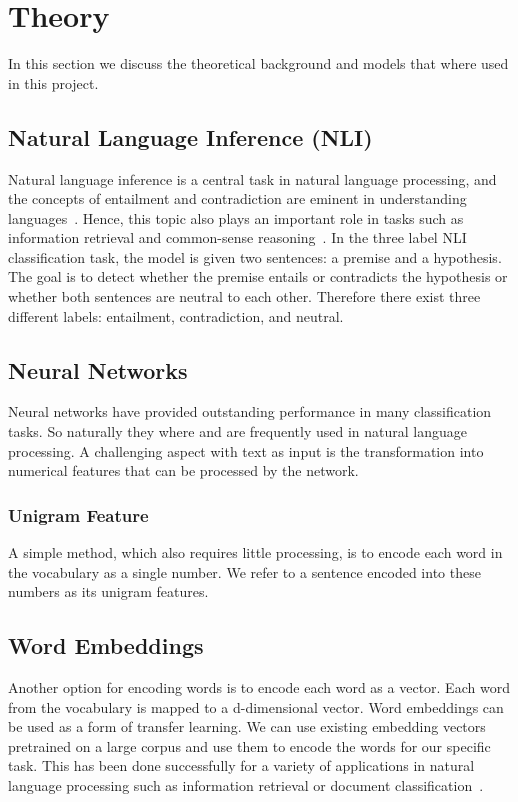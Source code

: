\documentclass[acmsmall,nonacm]{acmart}
\begin{document}
\section{Theory}
In this section we discuss the theoretical background and models that where used in this project.

\subsection{Natural Language Inference (NLI)} \label{sec:nli}
Natural language inference is a central task in natural language processing, and the concepts of entailment and contradiction are eminent in understanding languages~\cite{snli-bowman2015}. Hence, this topic also plays an important role in tasks such as information retrieval and common-sense reasoning~\cite{snli-bowman2015}. In the three label NLI classification task, the model is given two sentences: a premise and a hypothesis. The goal is to detect whether the premise entails or contradicts the hypothesis or whether both sentences are neutral to each other. Therefore there exist three different labels: entailment, contradiction, and neutral. 


\subsection{Neural Networks}
Neural networks have provided outstanding performance in many classification tasks. %
So naturally they where and are frequently used in natural language processing. A challenging aspect with text as input is the transformation into numerical features that can be processed by the network. 

\subsubsection{Unigram Feature}
A simple method, which also requires little processing, is to encode each word in the vocabulary as a single number. We refer to a sentence encoded into these numbers as its unigram features.

\subsection{Word Embeddings}
Another option for encoding words is to encode each word as a vector. Each word from the vocabulary is mapped to a d-dimensional vector. Word embeddings can be used as a form of transfer learning. We can use existing embedding vectors pretrained on a large corpus and use them to encode the words for our specific task. This has been done successfully for a variety of applications in natural language processing such as information retrieval or document classification~\cite{glove-pennington2014}.
\end{document}
